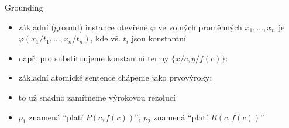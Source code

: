 \documentclass{beamer}
\begin{document}
\begin{frame}{Grounding}

    \begin{itemize}
        \item \alert{základní (ground) instance} otevřené $\varphi$ ve volných proměnných $x_1,\dots,x_n$ je $\varphi(x_1/t_1,\dots,x_n/t_n)$, kde vš. $t_i$ jsou konstantní
        
        \bigskip
        
        
        \bigskip
        \item např. pro  substituujeme \alert{konstantní} termy $\{x/c,y/f(c)\}$:
        

        \item základní atomické sentence chápeme jako prvovýroky: 
        

        \item to už snadno zamítneme výrokovou rezolucí
        \item $p_1$ znamená ``platí $P(c,f(c))$'', $p_2$ znamená ``platí $R(c,f(c))$''        
    \end{itemize}
    
\end{frame}
\end{document}
